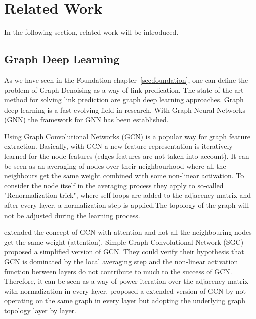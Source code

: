 \chapter{Related Work}
\label{sec:relatedWork}

In the following section, related work will be introduced.

\section{Graph Deep Learning}
As we have seen in the Foundation chapter~\ref{sec:foundation}, one can define the problem of Graph Denoising as
a way of link predication. The state-of-the-art method for solving link prediction are graph deep learning approaches.
Graph deep learning is a fast evolving field in research. With Graph Neural Networks (GNN)\cite{GNN} the framework
for GNN has been established. 

Using Graph Convolutional Networks (GCN) \cite{GCN} is a popular way for graph feature extraction. 
Basically, with GCN a new feature representation is iteratively learned for the node features (edges features are not taken into account).
It can be seen as an averaging of nodes over their neighbourhood where all the neighbours get the same weight combined with some non-linear activation. 
To consider the node itself in the averaging process they apply to so-called "Renormalization trick", where self-loops are added to the 
adjacency matrix and after every layer, a normalization step is applied.The topology of the graph will not be adjusted during the learning process.

\citet{GAT} extended the concept of GCN with attention and not all the neighbouring nodes get the same weight (attention).
Simple Graph Convolutional Network (SGC) \cite{simpleGCN} proposed a simplified version of GCN.
They could verify their hypothesis that GCN is dominated by the local averaging step and the non-linear 
activation function between layers do not contribute to much to the success of GCN. 
Therefore, it can be seen as a way of power iteration over the adjacency matrix with normalization in every layer.
\citet{dynamicGCN} proposed a extended version of GCN by not operating on the same graph in every layer but adopting
the underlying graph topology layer by layer.



